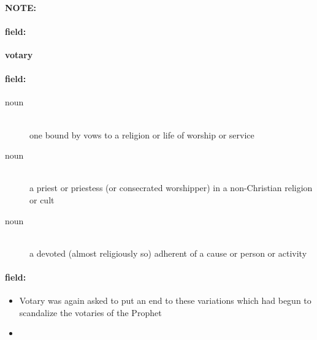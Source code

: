 \documentclass[12pt]{article}
\newenvironment{note}{\paragraph{NOTE:}}{}
\newenvironment{field}{\paragraph{field:}}{}
\begin{document}
\begin{note}
\begin{field}
\textbf{\large votary}
\end{field}


\begin{field}
\begin{description}
\item[noun] \hfill \\ 
one bound by vows to a religion or life of worship or service

\item[noun] \hfill \\ 
a priest or priestess (or consecrated worshipper) in a non-Christian religion or cult

\item[noun] \hfill \\ 
a devoted (almost religiously so) adherent of a cause or person or activity

\end{description}
\end{field}

\begin{field}
\begin{itemize}
\item Votary was again asked to put an end to these variations which had begun to scandalize the votaries of the Prophet
\item 
\end{itemize}
\end{field}
\end{note}
\end{document}
